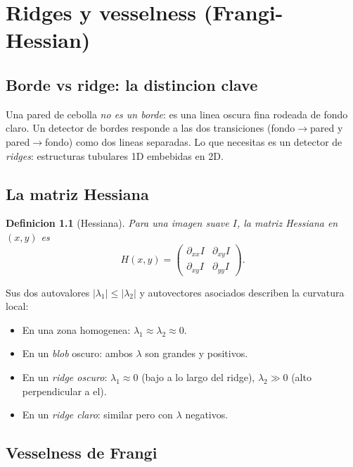 \documentclass[11pt,a4paper,twoside,openright]{book}
\newtheorem{definicion}{Definicion}[chapter]
\begin{document}
\chapter{Ridges y vesselness (Frangi-Hessian)}
\label{ch:ridges}

\section{Borde vs ridge: la distincion clave}

Una pared de cebolla \emph{no es un borde}: es una linea oscura fina rodeada de fondo claro. Un detector de bordes responde a las dos transiciones (fondo$\to$pared y pared$\to$fondo) como dos lineas separadas. Lo que necesitas es un detector de \emph{ridges}: estructuras tubulares 1D embebidas en 2D.

\section{La matriz Hessiana}

\begin{definicion}[Hessiana]
Para una imagen suave $I$, la \emph{matriz Hessiana} en $(x,y)$ es
\begin{equation}
H(x,y) = \begin{pmatrix} \partial_{xx} I & \partial_{xy} I \\ \partial_{xy} I & \partial_{yy} I \end{pmatrix}.
\end{equation}
\end{definicion}

Sus dos autovalores $|\lambda_1| \leq |\lambda_2|$ y autovectores asociados describen la curvatura local:

\begin{itemize}[leftmargin=2em]
  \item En una zona homogenea: $\lambda_1 \approx \lambda_2 \approx 0$.
  \item En un \emph{blob} oscuro: ambos $\lambda$ son grandes y positivos.
  \item En un \emph{ridge oscuro}: $\lambda_1 \approx 0$ (bajo a lo largo del ridge), $\lambda_2 \gg 0$ (alto perpendicular a el).
  \item En un \emph{ridge claro}: similar pero con $\lambda$ negativos.
\end{itemize}

\section{Vesselness de Frangi}
\end{document}
